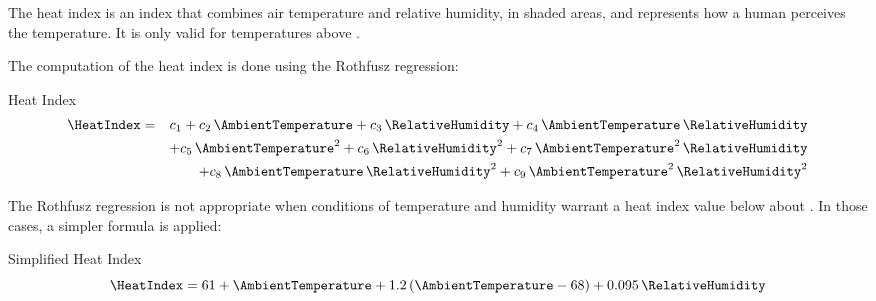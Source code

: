 \label{sec:HeatIndex}

The heat index is an index that combines air temperature and relative humidity, in shaded areas,
and represents how a human perceives the temperature.
It is only valid for temperatures above .

The computation of the heat index is done using the Rothfusz regression:

\begin{definition}Heat Index
\begin{eqnarray*}
    \HeatIndex &=& c_1 + c_2\,\AmbientTemperature + c_3\,\RelativeHumidity + c_4\,\AmbientTemperature\,\RelativeHumidity \\
    && + c_5\,\AmbientTemperature^2 + c_6\,\RelativeHumidity^2 + c_7\,\AmbientTemperature^2\,\RelativeHumidity \\
    && + c_8\,\AmbientTemperature\,\RelativeHumidity^2 + c_9\,\AmbientTemperature^2\,\RelativeHumidity^2
\end{eqnarray*}

\end{definition}

The Rothfusz regression is not appropriate when conditions of temperature and humidity warrant a heat index value below about .
In those cases, a simpler formula is applied:
\begin{definition}Simplified Heat Index
\[ \HeatIndex = 61 + \AmbientTemperature + 1.2\,(\AmbientTemperature - 68) + 0.095\,\RelativeHumidity \]

\end{definition}

